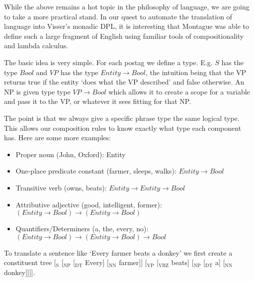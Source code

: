 \documentclass[12pt]{article}
\begin{document}
While the above remains a hot topic in the philosophy of language, we are going to take a more practical stand. In our quest to automate the translation of language into Visser's monadic DPL, it is interesting that Montague was able to define such a large fragment of English using familiar tools of compositionality and lambda calculus.

The basic idea is very simple. For each postag we define a type. E.g. $S$ has the type $Bool$ and $VP$ has the type $Entity \rightarrow Bool$, the intuition being that the VP returns true if the entity `does what the VP described' and false otherwise. An NP is given type type $VP \rightarrow Bool$ which allows it to create a scope for a variable and pass it to the VP, or whatever it sees fitting for that NP.

The point is that we always give a specific phrase type the same logical type. This allows our composition rules to know exactly what type each component has. Here are some more examples:
\begin{itemize}
\item Proper noun (John, Oxford): Entity
\item One-place predicate constant (farmer, sleeps, walks): $Entity \rightarrow Bool$
\item Transitive verb (owns, beats): $Entity \rightarrow Entity \rightarrow Bool$
\item Attributive adjective (good, intelligent, former): $(Entity \rightarrow Bool) \rightarrow (Entity \rightarrow Bool)$
\item Quantifiers/Determiners (a, the, every, no): $(Entity \rightarrow Bool) \rightarrow (Entity \rightarrow Bool) \rightarrow Bool$
\end{itemize}

To translate a sentence like `Every farmer beats a donkey' we first create a constituent tree [$_\text{S}$ [$_\text{NP}$ [$_\text{DT}$ Every] [$_\text{NN}$ farmer]] [$_\text{VP}$ [$_\text{VBZ}$ beats] [$_\text{NP}$ [$_\text{DT}$ a] [$_\text{NN}$ donkey]]]].
\end{document}
